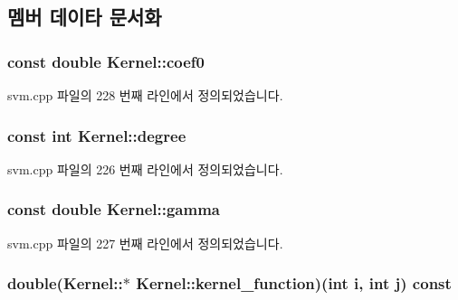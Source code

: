\subsection{멤버 데이타 문서화}
\hypertarget{class_kernel_a9b78d78675c9d5094daabf85c1d63b5d}{
\subsubsection[{coef0}]{\setlength{\rightskip}{0pt plus 5cm}const double Kernel\+::coef0\hspace{0.3cm}{\ttfamily [private]}}}\label{class_kernel_a9b78d78675c9d5094daabf85c1d63b5d}


svm.\+cpp 파일의 228 번째 라인에서 정의되었습니다.

\hypertarget{class_kernel_a332697fbc977298e3f8701224dbe4bf0}{
\subsubsection[{degree}]{\setlength{\rightskip}{0pt plus 5cm}const int Kernel\+::degree\hspace{0.3cm}{\ttfamily [private]}}}\label{class_kernel_a332697fbc977298e3f8701224dbe4bf0}


svm.\+cpp 파일의 226 번째 라인에서 정의되었습니다.

\hypertarget{class_kernel_a3a8a0a00a7d58708d6a7c5bc9c872513}{
\subsubsection[{gamma}]{\setlength{\rightskip}{0pt plus 5cm}const double Kernel\+::gamma\hspace{0.3cm}{\ttfamily [private]}}}\label{class_kernel_a3a8a0a00a7d58708d6a7c5bc9c872513}


svm.\+cpp 파일의 227 번째 라인에서 정의되었습니다.

\hypertarget{class_kernel_a575eeb588e8a5c62ff3228a35e255a02}{
\subsubsection[{kernel\+\_\+function}]{\setlength{\rightskip}{0pt plus 5cm}double(Kernel\+::$\ast$ Kernel\+::kernel\+\_\+function)(int i, int j) const \hspace{0.3cm}{\ttfamily [protected]}}}\label{class_kernel_a575eeb588e8a5c62ff3228a35e255a02}



